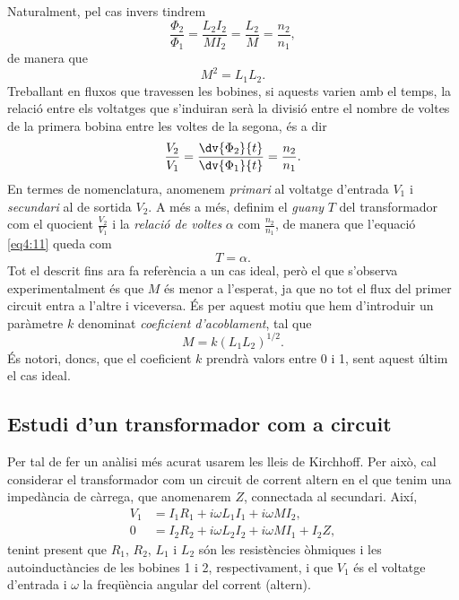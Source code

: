 \documentclass[a4paper,10.5pt]{report}
\begin{document}
Naturalment, pel cas invers tindrem
\begin{equation}
	\frac{\Phi_2}{\Phi_1}=\frac{L_2I_2}{MI_2}=\frac{L_2}{M}=\frac{n_2}{n_1}, \label{eq:4:9}
\end{equation}
de manera que
\begin{equation}
	M^2=L_1L_2. \label{eq:4:10}
\end{equation}
Treballant en fluxos que travessen les bobines, si aquests varien amb el temps, la relació entre els voltatges que s'induiran serà la divisió entre el nombre de voltes de la primera bobina entre les voltes de la segona, és a dir
\begin{equation}
	\frac{V_2}{V_1}=\frac{\dv{\Phi_2}{t}}{\dv{\Phi_1}{t}}=\frac{n_2}{n_1}. \label{eq4:11}
\end{equation}
En termes de nomenclatura, anomenem \textit{primari} al voltatge d'entrada $V_1$ i \textit{secundari} al de sortida $V_2$. A més a més, definim el \textit{guany}  $T$ del transformador com el quocient $\frac{V_2}{V_1}$ i la \textit{relació de voltes} $\alpha$ com $\frac{n_2}{n_1}$, de manera que l'equació \eqref{eq4:11} queda com
\begin{equation}
	T = \alpha. \label{eq:4.transf}
\end{equation}
Tot el descrit fins ara fa referència a un cas ideal, però el que s'observa experimentalment és que $M$ és menor a l'esperat, ja que no tot el flux del primer circuit entra a l'altre i viceversa. És per aquest motiu que hem d'introduir un paràmetre $k$ denominat \textit{coeficient d'acoblament}, tal que
\begin{equation}
	M=k(L_1L_2)^{1/2}. \label{eq4:12}
\end{equation}
És notori, doncs, que el coeficient $k$ prendrà valors entre 0 i 1, sent aquest últim el cas ideal.

\subsection{Estudi d'un transformador com a circuit}
Per tal de fer un anàlisi més acurat usarem les lleis de Kirchhoff. Per això, cal considerar el transformador com un circuit de corrent altern en el que tenim una impedància de càrrega, que anomenarem $Z$, connectada al secundari. Així,
\begin{align}
	V_1 &= I_1 R_1 + i \omega L_1 I_1 + i \omega M I_2 \label{eq4:13},\\
	0 & = I_2 R_2 + i \omega L_2 I_2 + i \omega M I_1 + I_2 Z \label{eq4:14},
\end{align}
tenint present que $R_1$, $R_2$, $L_1$ i $L_2$ són les resistències òhmiques i les autoinductàncies de les bobines 1 i 2, respectivament, i que $V_1$ és el voltatge d'entrada i $\omega$ la freqüència angular del corrent (altern).
\end{document}
